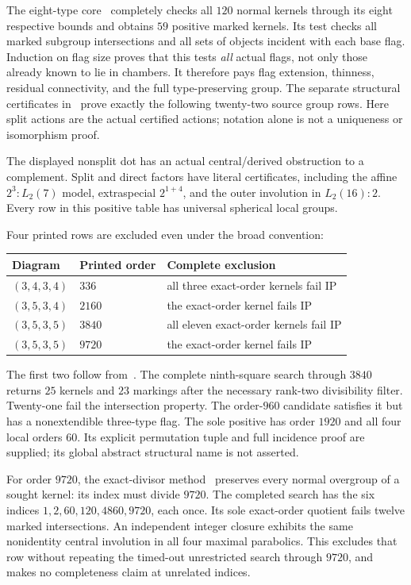 \documentclass[11pt,a4paper]{article}
\begin{document}
The eight-type core~\cite{core} completely checks all $120$ normal kernels
through its eight respective bounds and obtains $59$ positive marked
kernels. Its test checks all marked subgroup intersections and all sets of
objects incident with each base flag. Induction on flag size proves that
this tests \emph{all} actual flags, not only those already known to lie in
chambers. It therefore pays flag extension, thinness, residual connectivity,
and the full type-preserving group. The separate structural certificates
in~\cite{names} prove exactly the following twenty-two source group rows.
Here split actions are the actual certified actions; notation alone is not
a uniqueness or isomorphism proof.

The displayed nonsplit dot has an actual central/derived obstruction to a
complement. Split and direct factors have literal certificates, including
the affine $2^3:L_2(7)$ model, extraspecial $2^{1+4}$, and the outer
involution in $L_2(16):2$. Every row in this positive table has universal
spherical local groups.

Four printed rows are excluded even under the broad convention:
\begin{center}
\begin{tabular}{lll}\toprule
Diagram & Printed order & Complete exclusion\\\midrule
$(3,4,3,4)$&$336$&all three exact-order kernels fail IP\\
$(3,5,3,4)$&$2160$&the exact-order kernel fails IP\\
$(3,5,3,5)$&$3840$&all eleven exact-order kernels fail IP\\
$(3,5,3,5)$&$9720$&the exact-order kernel fails IP\\\bottomrule
\end{tabular}
\end{center}
The first two follow from~\cite{core}. The complete ninth-square search
through $3840$~\cite{square} returns $25$ kernels and $23$ markings after
the necessary rank-two divisibility filter. Twenty-one fail the intersection
property. The order-$960$ candidate satisfies it but has a nonextendible
three-type flag. The sole positive has order $1920$ and all four local
orders $60$. Its explicit permutation tuple and full incidence proof are
supplied; its global abstract structural name is not asserted.

For order $9720$, the exact-divisor method~\cite{divisor} preserves every
normal overgroup of a sought kernel: its index must divide $9720$.
The completed search has the six indices $1,2,60,120,4860,9720$, each once.
Its sole exact-order quotient fails twelve marked intersections. An
independent integer closure exhibits the same nonidentity central
involution in all four maximal parabolics. This excludes that row without
repeating the timed-out unrestricted search through $9720$, and makes no
completeness claim at unrelated indices.
\end{document}

